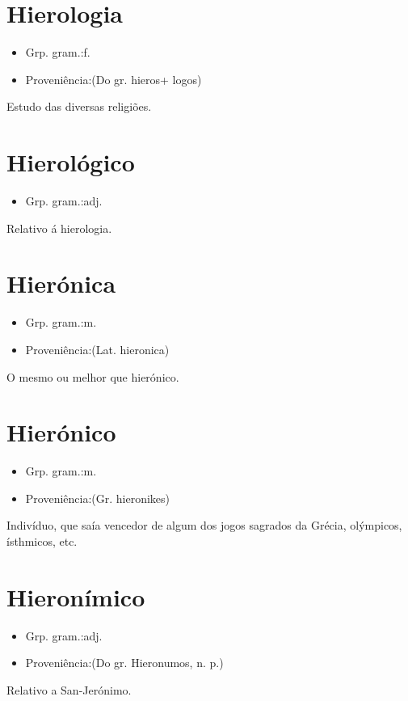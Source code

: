 \documentclass{article}
\begin{document}
\section{Hierologia}
\begin{itemize}
\item {Grp. gram.:f.}
\end{itemize}
\begin{itemize}
\item {Proveniência:(Do gr. \textunderscore hieros\textunderscore  + \textunderscore logos\textunderscore )}
\end{itemize}
Estudo das diversas religiões.
\section{Hierológico}
\begin{itemize}
\item {Grp. gram.:adj.}
\end{itemize}
Relativo á hierologia.
\section{Hierónica}
\begin{itemize}
\item {Grp. gram.:m.}
\end{itemize}
\begin{itemize}
\item {Proveniência:(Lat. \textunderscore hieronica\textunderscore )}
\end{itemize}
O mesmo ou melhor que \textunderscore hierónico\textunderscore .
\section{Hierónico}
\begin{itemize}
\item {Grp. gram.:m.}
\end{itemize}
\begin{itemize}
\item {Proveniência:(Gr. \textunderscore hieronikes\textunderscore )}
\end{itemize}
Indivíduo, que saía vencedor de algum dos jogos sagrados da Grécia, olýmpicos, ísthmicos, etc.
\section{Hieronímico}
\begin{itemize}
\item {Grp. gram.:adj.}
\end{itemize}
\begin{itemize}
\item {Proveniência:(Do gr. \textunderscore Hieronumos\textunderscore , n. p.)}
\end{itemize}
Relativo a San-Jerónimo.
\end{document}
